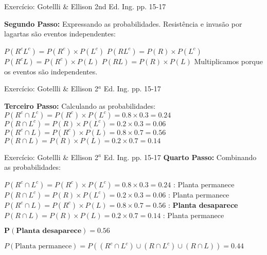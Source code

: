 \documentclass{beamer}\usepackage[]{graphicx}\usepackage[]{color}
\begin{document}
\begin{frame}{Exercício: Gotellli & Ellison 2nd Ed. Ing. pp. 15-17}

\textbf{Segundo Passo:} Expressando as probabilidades. Resistência e invasão por lagartas são eventos independentes:

\vfill
$P(R^cL^c) = P(R^c) \times P(L^c)$
\vfill
$P(RL^c) = P(R) \times P(L^c)$
\vfill
$P(R^cL) = P(R^c) \times P(L)$
\vfill
$P(RL) = P(R) \times P(L)$
\vfill
Multiplicamos porque os eventos são independentes.

\end{frame}

\begin{frame}{Exercício: Gotellli \& Ellison 2$^a$ Ed. Ing. pp. 15-17}

\textbf{Terceiro Passo:} Calculando as probabilidades:
\vfill
$P(R^c \cap L^c) = P(R^c) \times P(L^c) = 0.8 \times 0.3 = 0.24$
\vfill
$P(R \cap L^c) = P(R) \times P(L^c) = 0.2 \times 0.3 = 0.06$
\vfill
$P(R^c \cap L) = P(R^c) \times P(L) = 0.8 \times 0.7 = 0.56$
\vfill
$P(R \cap L) = P(R) \times P(L) = 0.2 \times 0.7 = 0.14$


\end{frame}

\begin{frame}{Exercício: Gotellli \& Ellison 2$^a$ Ed. Ing. pp. 15-17}
\textbf{Quarto Passo:} Combinando as probabilidades:
\begin{small}
\vfill
$P(R^c \cap L^c) = P(R^c) \times P(L^c) = 0.8 \times 0.3 = 0.24$ : Planta permanece
\vfill
$P(R \cap L^c) = P(R) \times P(L^c) = 0.2 \times 0.3 = 0.06$ : Planta permanece
\vfill
$P(R^c \cap L) = P(R^c) \times P(L) = 0.8 \times 0.7 = 0.56$ : \textbf{Planta desaparece}
\vfill
$P(R \cap L) = P(R) \times P(L) = 0.2 \times 0.7 = 0.14$ : Planta permanece
\vfill
\end{small}
$\mathbf{P(\textbf{Planta desaparece}) = 0.56}$

$P(\text{Planta permanece}) = P((R^c \cap L^c) \cup (R \cap L^c) \cup (R \cap L))  = 0.44$ 

\end{frame}
\end{document}
